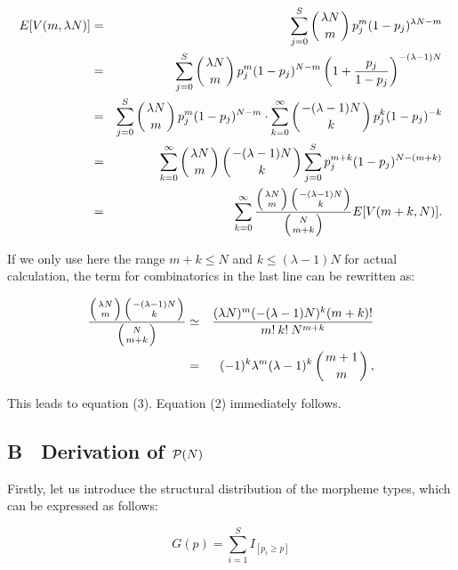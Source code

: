 \begin{eqnarray}
E[V(m,\lambda N)] & = & \sum_{j=0}^S \left ({\lambda N \atop m} \right )
    p_j^m (1-p_j)^{\lambda N -m} \nonumber \\
& = & \sum_{j=0}^S \left ({\lambda N \atop m} \right ) p_j^m (1-p_j)^{N -m}
    \left (1 + \frac{p_j}{1 - p_j} \right )^{-(\lambda -1)N}  \nonumber \\
& = & \sum_{j=0}^S \left ({\lambda N \atop m} \right ) p_j^m (1-p_j)^{N -m} 
\cdot \sum_{k=0}^{\infty} \left ({{-(\lambda -1)N} \atop k} \right ) p_j^k (1-p_j)^{-k}
           \nonumber \\
& = & \sum_{k=0}^{\infty}  \left ({\lambda N \atop m} \right )
    \left ( {{-(\lambda -1) N} \atop k} \right )
    \sum_{j=0}^S  p_j^{m+k} (1-p_j)^{N -(m+k)}     \nonumber \\
& = & \sum_{k=0}^{\infty}  \frac{\left ({\lambda N \atop m} \right )
    \left ( {{-(\lambda -1) N} \atop k} \right )}{\left ( {N \atop {m+k}} \right )}
    E[V(m+k,N)]. \nonumber
\end{eqnarray}

\noindent
If we only use here the range $m+k \leq N$ and $k \leq (\lambda -1)N$
for actual calculation, the term for combinatorics in the last line
can be rewritten as:

\vspace*{-\baselineskip}
 
\begin{eqnarray}
\frac{\left ({\lambda N \atop m} \right ) \left ( {{-(\lambda -1) N} \atop k}
    \right )}{\left ( {N \atop {m+k}} \right )}
    & \simeq & \frac{ (\lambda N)^m (-(\lambda -1)N)^k(m+k)! }{
    m!\:k!\:N^{m+k} } \nonumber \\
& = & (-1)^k \lambda^m (\lambda -1)^k \left ( {{m+1} \atop m} \right ), \nonumber
\end{eqnarray}

\noindent
This leads to equation (3). Equation (2) immediately follows.



\subsection*{B　Derivation of ${\cal P}(N)$}


Firstly, let us introduce the structural distribution of the morpheme
types, which can be expressed as follows:
 
\begin{displaymath}
G(p) = \sum_{i=1}^S I_{[p_i\geq p]}
\end{displaymath}

